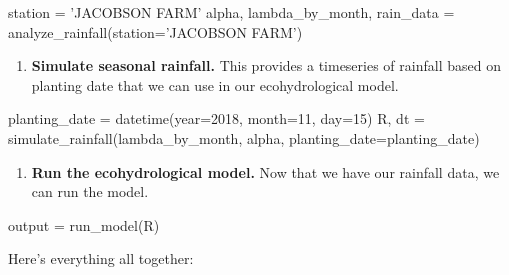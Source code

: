 \documentclass[11pt]{article}
\providecommand{\tightlist}{%
      \setlength{\itemsep}{0pt}\setlength{\parskip}{0pt}}
\newenvironment{Shaded}{}{}
\newcommand{\DecValTok}[1]{\textcolor[rgb]{0.25,0.63,0.44}{{#1}}}
\newcommand{\StringTok}[1]{\textcolor[rgb]{0.25,0.44,0.63}{{#1}}}
\newcommand{\NormalTok}[1]{{#1}}
\newcommand{\OperatorTok}[1]{\textcolor[rgb]{0.40,0.40,0.40}{{#1}}}
\begin{document}
\begin{Shaded}
\begin{Highlighting}[]
\NormalTok{station }\OperatorTok{=} \StringTok{'JACOBSON FARM'}
\NormalTok{alpha, lambda_by_month, rain_data }\OperatorTok{=}\NormalTok{ analyze_rainfall(station}\OperatorTok{=}\StringTok{'JACOBSON FARM'}\NormalTok{)}
\end{Highlighting}
\end{Shaded}

\begin{enumerate}
\def\labelenumi{\arabic{enumi}.}
\setcounter{enumi}{1}
\tightlist
\item
  \textbf{Simulate seasonal rainfall.} This provides a timeseries of
  rainfall based on planting date that we can use in our ecohydrological
  model.
\end{enumerate}

\begin{Shaded}
\begin{Highlighting}[]
\NormalTok{planting_date }\OperatorTok{=}\NormalTok{ datetime(year}\OperatorTok{=}\DecValTok{2018}\NormalTok{, month}\OperatorTok{=}\DecValTok{11}\NormalTok{, day}\OperatorTok{=}\DecValTok{15}\NormalTok{)}
\NormalTok{R, dt }\OperatorTok{=}\NormalTok{ simulate_rainfall(lambda_by_month, alpha, planting_date}\OperatorTok{=}\NormalTok{planting_date)}
\end{Highlighting}
\end{Shaded}

\begin{enumerate}
\def\labelenumi{\arabic{enumi}.}
\setcounter{enumi}{2}
\tightlist
\item
  \textbf{Run the ecohydrological model.} Now that we have our rainfall
  data, we can run the model.
\end{enumerate}

\begin{Shaded}
\begin{Highlighting}[]
\NormalTok{    output }\OperatorTok{=}\NormalTok{ run_model(R)}
\end{Highlighting}
\end{Shaded}

Here's everything all together:
\end{document}

